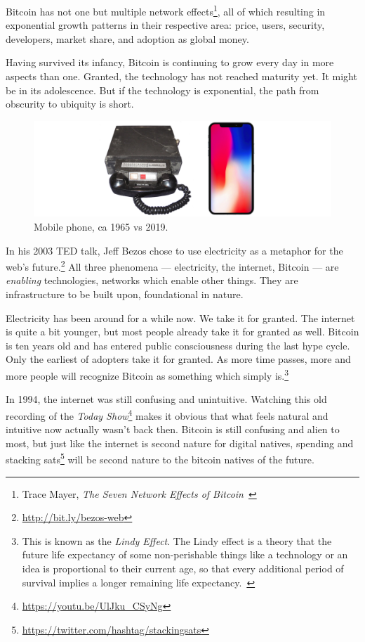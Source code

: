 Bitcoin has not one but multiple network effects\footnote{Trace Mayer,
\textit{The Seven Network Effects of Bitcoin}~\cite{7-network-effects}}, all of
which resulting in exponential growth patterns in their respective area: price,
users, security, developers, market share, and adoption as global money.

Having survived its infancy, Bitcoin is continuing to grow every day in
more aspects than one. Granted, the technology has not reached maturity
yet. It might be in its adolescence. But if the technology is
exponential, the path from obscurity to ubiquity is short.

\begin{figure}
  \includegraphics{assets/images/mobile-phone.png}
  \caption{Mobile phone, ca 1965 vs 2019.}
  \label{fig:mobile-phone}
\end{figure}

In his 2003 TED talk, Jeff Bezos chose to use electricity as a metaphor for the
web's future.\footnote{\url{http://bit.ly/bezos-web}} All three phenomena ---
electricity, the internet, Bitcoin --- are \textit{enabling} technologies,
networks which enable other things. They are infrastructure to be built upon,
foundational in nature.

Electricity has been around for a while now. We take it for granted. The
internet is quite a bit younger, but most people already take it for
granted as well. Bitcoin is ten years old and has entered public
consciousness during the last hype cycle. Only the earliest of adopters
take it for granted. As more time passes, more and more people will
recognize Bitcoin as something which simply is.\footnote{This is known as the
\textit{Lindy Effect}. The Lindy effect is a theory that the future life expectancy
of some non-perishable things like a technology or an idea is proportional to
their current age, so that every additional period of survival implies a longer
remaining life expectancy.~\cite{wiki:lindy}}

In 1994, the internet was still confusing and unintuitive. Watching this old
recording of the \textit{Today
Show}\footnote{\url{https://youtu.be/UlJku_CSyNg}} makes it obvious that what
feels natural and intuitive now actually wasn't back then. Bitcoin is still
confusing and alien to most, but just like the internet is second nature for
digital natives, spending and stacking
sats\footnote{\url{https://twitter.com/hashtag/stackingsats}} will be second
nature to the bitcoin natives of the future.

